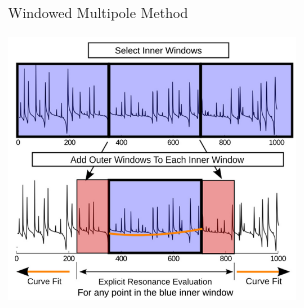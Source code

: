 \documentclass[noamssymb,svgnames]{beamer}
\begin{document}
\begin{frame}{Windowed Multipole Method}
  \begin{center}
    \includegraphics[width=3in]{../images/windowed_multipole.png}
  \end{center}
\end{frame}
\end{document}
